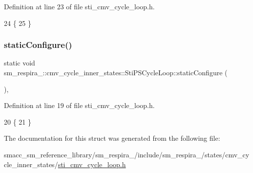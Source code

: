 Definition at line 23 of file sti\+\_\+cmv\+\_\+cycle\+\_\+loop.\+h.


\begin{DoxyCode}
24   \{
25   \}
\end{DoxyCode}
\mbox{\label{structsm__respira__1_1_1cmv__cycle__inner__states_1_1StiPSCycleLoop_a7856305b3ed2b17640521d53f00c9547}} 
\subsubsection{\texorpdfstring{static\+Configure()}{staticConfigure()}}
{\footnotesize\ttfamily static void sm\+\_\+respira\+\_\+::cmv\+\_\+cycle\+\_\+inner\+\_\+states\+::\+Sti\+P\+S\+Cycle\+Loop\+::static\+Configure (\begin{DoxyParamCaption}{ }\end{DoxyParamCaption})\hspace{0.3cm}{\ttfamily [inline]}, {\ttfamily [static]}}



Definition at line 19 of file sti\+\_\+cmv\+\_\+cycle\+\_\+loop.\+h.


\begin{DoxyCode}
20   \{
21   \}
\end{DoxyCode}


The documentation for this struct was generated from the following file\+:\begin{DoxyCompactItemize}
\item 
smacc\+\_\+sm\+\_\+reference\+\_\+library/sm\+\_\+respira\+\_/include/sm\+\_\+respira\+\_/states/cmv\+\_\+cycle\+\_\+inner\+\_\+states/\hyperlink{sti__cmv__cycle__loop_8h}{sti\+\_\+cmv\+\_\+cycle\+\_\+loop.\+h}\end{DoxyCompactItemize}
